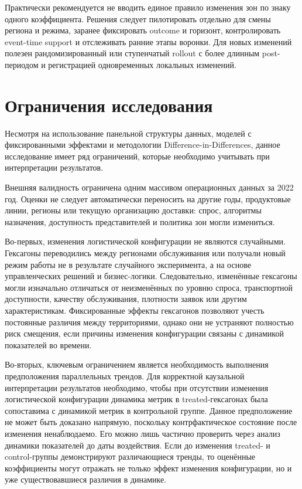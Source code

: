 \documentclass[14pt,a4paper]{extarticle}
\begin{document}
Практически рекомендуется не вводить единое правило изменения зон по знаку
одного коэффициента. Решения следует пилотировать отдельно для смены региона и
режима, заранее фиксировать outcome и горизонт, контролировать event-time
support и отслеживать ранние этапы воронки. Для новых изменений полезен
рандомизированный или ступенчатый rollout с более длинным post-периодом и
регистрацией одновременных локальных изменений.

\section{Ограничения исследования}

Несмотря на использование панельной структуры данных, моделей с фиксированными эффектами и методологии Difference-in-Differences, данное исследование имеет ряд ограничений, которые необходимо учитывать при интерпретации результатов.

Внешняя валидность ограничена одним массивом операционных данных за 2022 год.
Оценки не следует автоматически переносить на другие годы, продуктовые линии,
регионы или текущую организацию доставки: спрос, алгоритмы назначения,
доступность представителей и политика зон могли измениться.

Во-первых, изменения логистической конфигурации не являются случайными. Гексагоны переводились между регионами обслуживания или получали новый режим работы не в результате случайного эксперимента, а на основе управленческих решений и бизнес-логики. Следовательно, изменённые гексагоны могли изначально отличаться от неизменённых по уровню спроса, транспортной доступности, качеству обслуживания, плотности заявок или другим характеристикам. Фиксированные эффекты гексагонов позволяют учесть постоянные различия между территориями, однако они не устраняют полностью риск смещения, если причины изменения конфигурации связаны с динамикой показателей во времени.

Во-вторых, ключевым ограничением является необходимость выполнения предположения параллельных трендов. Для корректной каузальной интерпретации результатов необходимо, чтобы при отсутствии изменения логистической конфигурации динамика метрик в treated-гексагонах была сопоставима с динамикой метрик в контрольной группе. Данное предположение не может быть доказано напрямую, поскольку контрфактическое состояние после изменения ненаблюдаемо. Его можно лишь частично проверить через анализ динамики показателей до даты воздействия. Если до изменения treated- и control-группы демонстрируют различающиеся тренды, то оценённые коэффициенты могут отражать не только эффект изменения конфигурации, но и уже существовавшиеся различия в динамике.
\end{document}
